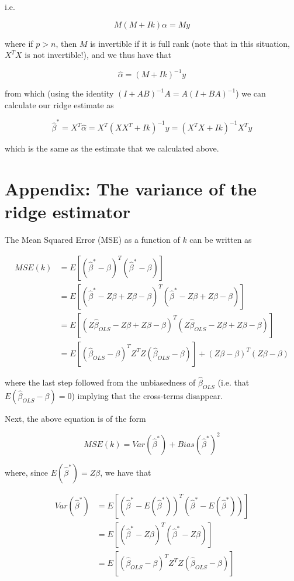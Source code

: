 i.e. 

$$M(M + I k) \alpha = My$$


where if $p > n$, then $M$ is invertible if it is full rank (note that in this situation, $X^TX$ is not invertible!), and we thus have that

$$\hat{\alpha}  = (M + Ik)^{-1} y$$


from which (using the identity $(I + AB)^{-1}A = A(I + BA)^{-1}$) we can calculate our ridge estimate as

$$\hat{\beta}^* = X^T \hat{\alpha} = X^T (XX^T + Ik)^{-1}y = (X^TX + Ik)^{-1} X^Ty$$



which is the same as the estimate that we calculated above.

\section{Appendix: The variance of the ridge estimator}
The Mean Squared Error (MSE) as a function of $k$ can be written as

\begin{align*}
MSE(k) & = E \left[ \left(\hat{\beta}^* - \beta\right)^T\left(\hat{\beta}^* - \beta\right) \right]\\
& =  E \left[ \left(\hat{\beta}^* - Z\beta + Z\beta - \beta\right)^T\left(\hat{\beta}^* - Z\beta + Z\beta -  \beta\right) \right]\\
& =  E \left[ \left(Z\hat{\beta}_{OLS} - Z\beta + Z\beta - \beta\right)^T\left(Z\hat{\beta}_{OLS} - Z\beta + Z\beta -  \beta\right) \right]\\
& = E\left[ \left(\hat{\beta}_{OLS} - \beta \right)^T Z^TZ \left( \hat{\beta}_{OLS} - \beta \right) \right] + (Z\beta - \beta)^T(Z\beta - \beta)
\end{align*}


where the last step followed from the unbiasedness of $\hat{\beta}_{OLS}$ (i.e. that $E(\hat{\beta}_{OLS} - \beta) = 0$) implying that the cross-terms disappear.



Next, the above equation is of the form

$$MSE(k) = Var\left( \hat{\beta}^* \right) + Bias\left(\hat{\beta}^*\right)^2$$

where, since $E\left( \hat{\beta}^*\right ) = Z \beta$, we have that

\begin{align*}
Var\left(\hat{\beta}^*\right) &= E\left[ \left( \hat{\beta}^* - E \left(\hat{\beta}^*\right) \right)^T\left( \hat{\beta}^* - E \left(\hat{\beta}^*\right) \right) \right]\\
& = E \left[ \left(\hat{\beta}^* - Z \beta\right)^T\left(\hat{\beta}^* - Z \beta\right) \right]\\
& = E\left[ \left( \hat{\beta}_{OLS} - \beta \right)^TZ^T Z\left( \hat{\beta}_{OLS} - \beta \right) \right]
\end{align*}



